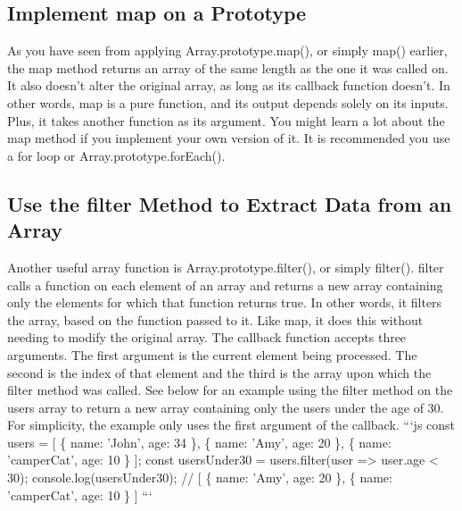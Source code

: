 \documentclass{article}%
\begin{document}
%
\subsection{Implement map on a Prototype}%
\label{subsec:ImplementmaponaPrototype}%
As you have seen from applying Array.prototype.map(), or simply map() earlier, the map method returns an array of the same length as the one it was called on. It also doesn't alter the original array, as long as its callback function doesn't.\newline%
In other words, map is a pure function, and its output depends solely on its inputs. Plus, it takes another function as its argument.\newline%
You might learn a lot about the map method if you implement your own version of it. It is recommended you use a for loop or Array.prototype.forEach().\newline%

%
\subsection{Use the filter Method to Extract Data from an Array}%
\label{subsec:UsethefilterMethodtoExtractDatafromanArray}%
Another useful array function is Array.prototype.filter(), or simply filter(). \newline%
filter calls a function on each element of an array and returns a new array containing only the elements for which that function returns true.  In other words, it filters the array, based on the function passed to it.  Like map, it does this without needing to modify the original array.\newline%
The callback function accepts three arguments.  The first argument is the current element being processed.  The second is the index of that element and the third is the array upon which the filter method was called.\newline%
See below for an example using the filter method on the users array to return a new array containing only the users under the age of 30. For simplicity, the example only uses the first argument of the callback.\newline%
```js\newline%
const users = {[}\newline%
  \{ name: 'John', age: 34 \},\newline%
  \{ name: 'Amy', age: 20 \},\newline%
  \{ name: 'camperCat', age: 10 \}\newline%
{]};\newline%
const usersUnder30 = users.filter(user => user.age < 30);\newline%
console.log(usersUnder30); // {[} \{ name: 'Amy', age: 20 \}, \{ name: 'camperCat', age: 10 \} {]}\newline%
```\newline%
\end{document}
